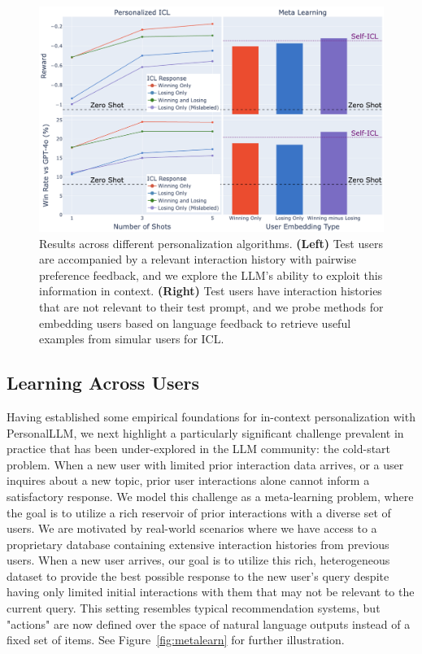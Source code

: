 \begin{figure}[!ht]
    \centering
    \includegraphics[width=\textwidth]{figures/fig6sharp.png}
    \caption{Results across different personalization algorithms. 
    \textbf{(Left)} Test users are accompanied by a relevant interaction history with pairwise preference feedback, and we explore the LLM's ability to exploit this information in context. 
    \textbf{(Right)} Test users have interaction histories that are not relevant to their test prompt, and we probe methods for embedding users based on language feedback to retrieve useful examples from simular users for ICL.}
    \label{fig:exp_results}
\end{figure}


\subsection{Learning Across Users}

Having established some empirical foundations for in-context personalization with \textsf{PersonalLLM}, we next highlight a particularly significant challenge prevalent in practice that has been under-explored in the LLM community: the cold-start problem. 
When a new user with limited prior interaction data arrives, or a user inquires about a new topic, prior user interactions alone cannot inform a satisfactory response.
We model this challenge as a meta-learning problem, where the goal is to utilize a rich reservoir of prior interactions with a diverse set of users. 
We are motivated by real-world scenarios where we have access to a proprietary database containing extensive interaction histories from previous users. 
When a new user arrives, our goal is to utilize this rich, heterogeneous dataset to provide the best possible response to the new user's query despite having only limited initial interactions with them that may not be relevant to the current query. 
This setting resembles typical recommendation systems, but "actions" are now defined over the space of natural language outputs instead of a fixed set of items.
See Figure~\ref{fig:metalearn} for further illustration.

